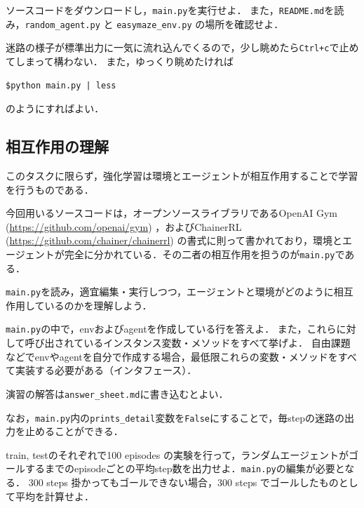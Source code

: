   \begin{practice}
   ソースコードをダウンロードし，\verb+main.py+を実行せよ．
   また，\verb+README.md+を読み，\verb+random_agent.py+ と \verb+easymaze_env.py+ の場所を確認せよ．
  \end{practice}

  迷路の様子が標準出力に一気に流れ込んでくるので，少し眺めたら\verb-Ctrl+c-で止めてしまって構わない．
  また，ゆっくり眺めたければ
  \begin{lstlisting}[basicstyle=\ttfamily\footnotesize, frame=single]
   $python main.py | less
  \end{lstlisting}
  のようにすればよい．

  \subsection{相互作用の理解}
  このタスクに限らず，強化学習は環境とエージェントが相互作用することで学習を行うものである．

  今回用いるソースコードは，オープンソースライブラリであるOpenAI Gym (\url{https://github.com/openai/gym}) ，およびChainerRL (\url{https://github.com/chainer/chainerrl}) の書式に則って書かれており，環境とエージェントが完全に分かれている．その二者の相互作用を担うのが\verb+main.py+である．

  \verb+main.py+を読み，適宜編集・実行しつつ，エージェントと環境がどのように相互作用しているのかを理解しよう．

  \begin{practice}
   \verb+main.py+の中で，envおよびagentを作成している行を答えよ．
   また，これらに対して呼び出されているインスタンス変数・メソッドをすべて挙げよ．
   自由課題などでenvやagentを自分で作成する場合，最低限これらの変数・メソッドをすべて実装する必要がある（インタフェース）．
  \end{practice}

  演習の解答は\verb+answer_sheet.md+に書き込むとよい．

  なお，\verb+main.py+内の\verb+prints_detail+変数を\verb+False+にすることで，毎stepの迷路の出力を止めることができる．

  \begin{practice}
   \label{practice:100episodes}
   train, testのそれぞれで100 episodes の実験を行って，ランダムエージェントがゴールするまでのepisodeごとの平均step数を出力せよ．\verb+main.py+の編集が必要となる．
   300 steps 掛かってもゴールできない場合，300 steps でゴールしたものとして平均を計算せよ．
  \end{practice}

